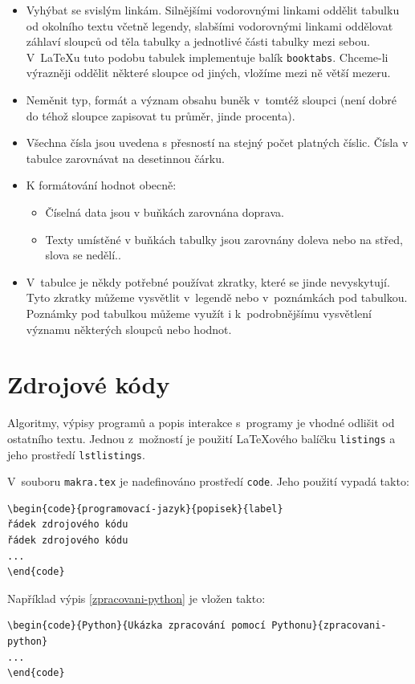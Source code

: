 \begin{itemize} %
\item Vyhýbat se svislým linkám. Silnějšími vodorovnými linkami
  oddělit tabulku od okolního textu včetně legendy, slabšími
  vodorovnými linkami oddělovat záhlaví sloupců od těla tabulky a
  jednotlivé části tabulky mezi sebou. V~\LaTeX u tuto podobu tabulek
  implementuje balík \texttt{booktabs}. Chceme-li výrazněji oddělit
  některé sloupce od jiných, vložíme mezi ně větší mezeru.
\item Neměnit typ, formát a význam obsahu buněk v~tomtéž sloupci
  (není dobré do téhož sloupce zapisovat tu průměr, jinde procenta).
\item Všechna čísla jsou uvedena s přesností na stejný počet platných číslic. Čísla v tabulce zarovnávat na desetinnou čárku.
\item K formátování hodnot obecně:
	\begin{itemize}
  \item Číselná data jsou v buňkách zarovnána doprava. 
  \item Texty umístěné v buňkách tabulky jsou zarovnány doleva nebo na střed, slova se nedělí..
	\end{itemize}
\item V~tabulce je někdy potřebné používat zkratky, které se jinde
nevyskytují. Tyto zkratky můžeme vysvětlit v~legendě nebo
v~poznámkách pod tabulkou. Poznámky pod tabulkou můžeme využít i
k~podrobnějšímu vysvětlení významu  některých sloupců nebo hodnot.
\end{itemize}


\section{Zdrojové kódy}
Algoritmy, výpisy programů a popis interakce s~programy je vhodné odlišit od ostatního textu. Jednou z~možností je použití {\LaTeX}o\-vé\-ho balíčku \texttt{listings} a jeho prostředí \texttt{lstlistings}.

V~souboru \texttt{makra.tex} je nadefinováno prostředí \texttt{code}. Jeho použití vypadá takto:
\begin{verbatim}
\begin{code}{programovací-jazyk}{popisek}{label}
řádek zdrojového kódu
řádek zdrojového kódu
...
\end{code}
\end{verbatim}

\noindent
Například výpis \ref{zpracovani-python} je vložen takto:
\begin{verbatim}
\begin{code}{Python}{Ukázka zpracování pomocí Pythonu}{zpracovani-python}
...
\end{code}
\end{verbatim}

